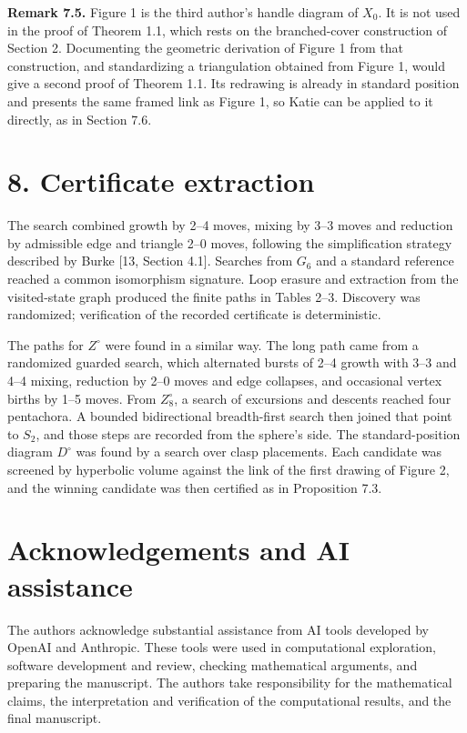 \documentclass[11pt,letterpaper]{article}
\begin{document}
\medskip\noindent\textbf{Remark 7.5.} Figure 1 is the third author's handle diagram of $X_0$. %
It is not used in the proof of Theorem 1.1, which rests on the branched-cover construction of Section 2. Documenting the geometric derivation of Figure 1 from that construction, and standardizing a triangulation obtained from Figure 1, would give a second proof of Theorem 1.1. Its redrawing is already in standard position and presents the same framed link as Figure 1, so Katie can be applied to it directly, as in Section 7.6.

\section*{8. Certificate extraction}
The search combined growth by 2--4 moves, mixing by 3--3 moves and reduction by admissible edge and triangle 2--0 moves, following the simplification strategy described by Burke [13, Section 4.1]. Searches from $G_6$ and a standard reference reached a common isomorphism signature. Loop erasure and extraction from the visited-state graph produced the finite paths in Tables 2--3. Discovery was randomized; verification of the recorded certificate is deterministic.

The paths for $Z^\circ$ were found in a similar way. The long path came from a randomized guarded search, which alternated bursts of 2--4 growth with 3--3 and 4--4 mixing, reduction by 2--0 moves and edge collapses, and occasional vertex births by 1--5 moves. From $Z^\circ_8$, a search of excursions and descents reached four pentachora. A bounded bidirectional breadth-first search then joined that point to $S_2$, and those steps are recorded from the sphere's side. The standard-position diagram $D^\circ$ was found by a search over clasp placements. Each candidate was screened by hyperbolic volume against the link of the first drawing of Figure 2, and the winning candidate was then certified as in Proposition 7.3.

\section*{Acknowledgements and AI assistance}
The authors acknowledge substantial assistance from AI tools developed by OpenAI and Anthropic. These tools were used in computational exploration, software development and review, checking mathematical arguments, and preparing the manuscript. The authors take responsibility for the mathematical claims, the interpretation and verification of the computational results, and the final manuscript.
\end{document}
